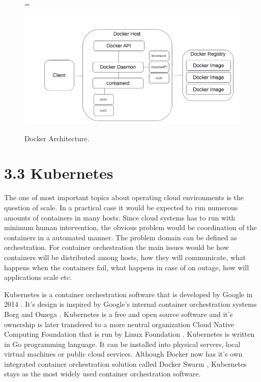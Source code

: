 \documentclass[12pt,oneandhalf,chaparabic,ceng,ms,eng,oneside,pntc]{gsufbe}
\makeatletter
\let\old@includegraphics\includegraphics
\renewcommand{\includegraphics}[2][,]{%
  \setbox9=\hbox{\old@includegraphics[#1]{#2}}%
  \ifdim\wd9>\textwidth
    \old@includegraphics[#1,width=\textwidth]{#2}%
  \else
    \old@includegraphics[#1]{#2}%
  \fi%
}
\makeatother
\begin{document}
\begin{figure}
\centering
\includegraphics[]{docker-arch.png}
\caption{Docker Architecture.}
\label{fig:dockerarch}
\end{figure}

\section[Kubernetes]{3.3 Kubernetes}
The one of most important topics about operating cloud environments is the question of scale.  In a
practical case it would be expected to run numerous amounts of containers in many hosts. Since
cloud systems has to run with minimum human intervention, the obvious problem would be coordination
of the containers in a automated manner.  The problem domain can be defined as orchestration.
For container orchestration the main issues would be how containers will be distributed among hosts,
how they will communicate, what happens when the containers fail, what happens in case of on outage,
how will applications scale etc.

Kubernetes is a container orchestration software that is developed by Google in 2014 \cite{Kubernetes}.
It's design is
inspired by Google's internal container orchestration systems Borg and Omega \cite{burns_borg_2016}.
Kubernetes is a free and open source software and it's ownership is later transfered to a more neutral
organization Cloud Native Computing Foundation \cite{cncf} that is run by Linux Foundation
\cite{linux_foundation}.  Kubernetes is written in Go programming language.
It can be installed into physical servers, local virtual machines or public cloud services.  Although
Docker now has it's own integrated container orchestration solution called Docker Swarm 
\cite{docker_swarm}, Kubernetes stays as the most widely used container orchestration software.
\end{document}
